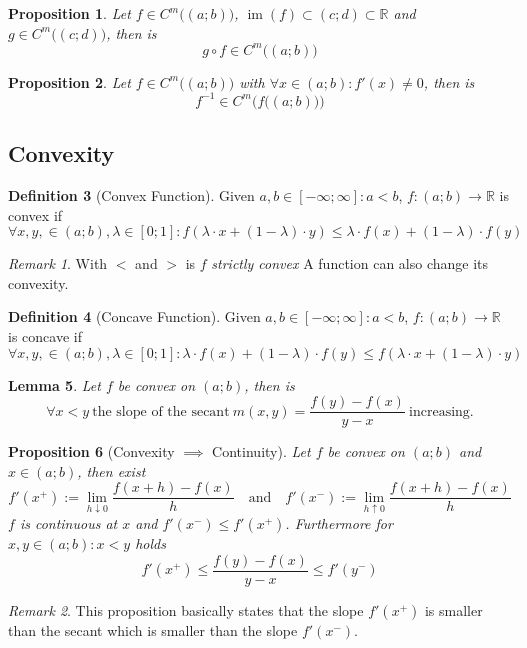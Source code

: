 \documentclass[english,titlepage]{uzhpub}
\DeclareMathOperator\im{im}
\theoremstyle{definition}
\newtheorem{definition}{Definition}[section]
\theoremstyle{plain}
\newtheorem{proposition}[definition]{Proposition}
\newtheorem{lemma}[definition]{Lemma}
\theoremstyle{remark}
\newtheorem*{remark}{Remark}
\theoremstyle{example}
\begin{document}
   \begin{proposition}\label{pro:func_comp_in_Cm}
      Let \(f \in C^m\big((a;b)\big)\), \(\im(f) \subset (c; d) \subset \mathbb{R}\) and \(g \in C^m\big((c; d)\big)\), then is
      \[g \circ f \in C^m\big((a;b)\big)\]
   \end{proposition}

   \begin{proposition}\label{pro:func_inv_in_Cm}
      Let \(f \in C^m\big((a;b)\big)\) with \(\forall x \in (a;b): f'(x) \neq 0\), then is
      \[f^{-1} \in C^m\bigg(f\big((a;b)\big)\bigg)\]
   \end{proposition}

   \subsection{Convexity}
   \begin{definition}[Convex Function]
      Given \(a, b \in [-\infty; \infty]: a < b\), \(f: (a; b) \to \mathbb{R}\) is convex if
      \[\forall x, y, \in (a; b), \lambda \in [0; 1]: f(\lambda \cdot x + (1 - \lambda) \cdot y) \leq \lambda \cdot f(x) + (1 - \lambda) \cdot f(y)\]
   \end{definition}
   \begin{remark}
      With \(<\) and \(>\) is \(f\) \textit{strictly convex}
      A function can also change its convexity.
   \end{remark}

   \begin{definition}[Concave Function]
      Given \(a, b \in [-\infty; \infty]: a < b\), \(f: (a; b) \to \mathbb{R}\) is concave if
      \[\forall x, y, \in (a; b), \lambda \in [0; 1]: \lambda \cdot f(x) + (1 - \lambda) \cdot f(y) \leq f(\lambda \cdot x + (1 - \lambda) \cdot y)\]
   \end{definition}

   \begin{center}
      
   \end{center}

   \begin{lemma}\label{lem:secant_increasing}
      Let \(f\) be convex on \((a;b)\), then is
      \[\forall x < y~\text{the slope of the secant}~m(x, y) = \frac{f(y) - f(x)}{y - x}~\text{increasing.}\]
   \end{lemma}

   \begin{proposition}[Convexity \(\implies\) Continuity]\label{pro:convex_implies_cont}
      Let \(f\) be convex on \((a; b)\) and \(x \in (a; b)\), then exist
      \[f'(x^+) := \lim_{h \downarrow 0} \frac{f(x + h) - f(x)}{h} \quad\text{and}\quad f'(x^-) := \lim_{h \uparrow 0} \frac{f(x + h) - f(x)}{h}\]
      \(f\) is continuous at \(x\) and \(f'(x^-) \leq f'(x^+)\).
      Furthermore for \(x, y \in (a; b): x < y\) holds
      \[f'(x^+) \leq \frac{f(y) - f(x)}{y - x} \leq f'(y^-)\]
   \end{proposition}
   \begin{remark}
      This proposition basically states that the slope \(f'(x^+)\) is smaller than the secant which is smaller than the slope \(f'(x^-)\).
   \end{remark}
\end{document}
